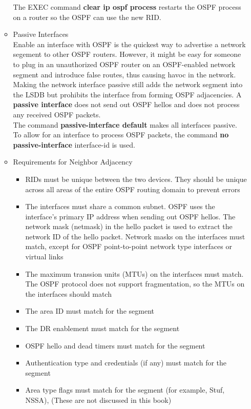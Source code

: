 \documentclass{article}
\begin{document}
\begin{itemize}
\begin{itemize}
				The EXEC command \textbf{clear ip ospf process} restarts the OSPF process on a router so the OSPF can use the new RID.
			\item Passive Interfaces\\
				Enable an interface with OSPF is the quickest way to advertise a network segement to other OSPF routers. However, it might be easy for someone to plug in an unauthorized OSPF router on an OSPF-enabled network segment and introduce false routes, thus causing havoc in the network. Making the network interface passive still adds the network segment into the LSDB but prohibits the interface from forming OSPF adjacencies. A \textbf{passive interface} does not send out OSPF hellos and does not process any received OSPF packets.\\

				The command \textbf{passive-interface default} makes all interfaces passive. To allow for an interface to process OSPF packets, the command \textbf{no passive-interface} interface-id is used.

			\item Requirements for Neighbor Adjacency\\
				\begin{itemize}
					\item RIDs must be unique between the two devices. They should be unique across all areas of the entire OSPF routing domain to prevent errors
					\item The interfaces must share a common subnet. OSPF uses the interface's primary IP address when sending out OSPF hellos. The network mask (netmask) in the hello packet is used to extract the network ID of the hello packet. Network masks on the interfaces must match, except for OSPF point-to-point network type interfaces or virtual links
					\item The maximum transsion units (MTUs) on the interfaces must match. The OSPF protocol does not support fragmentation, so the MTUs on the interfaces should match
					\item The area ID must match for the segment
					\item The DR enablement must match for the segment
					\item OSPF hello and dead timers must match for the segment
					\item Authentication type and credentials (if any) must match for the segment
					\item Area type flags must match for the segment (for example, Stuf, NSSA), (These are not discussed in this book)
				\end{itemize}


\end{itemize}
\end{itemize}
\end{document}
